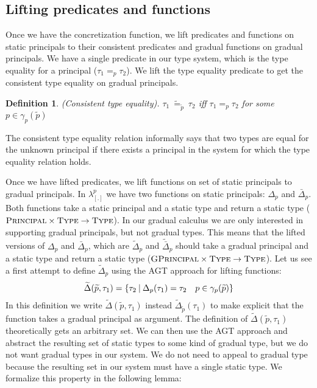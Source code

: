 \documentclass{article}
\newcommand\newcalculus[0]{$\lambda^p_{\left[.\right]}$}
\newcommand\wt[1]{\widetilde{#1}}
\newtheorem{definition}{Definition}[section]
\begin{document}
\subsection{Lifting predicates and functions}
Once we have the concretization function, we lift predicates and functions on static principals to their consistent predicates and gradual functions on gradual principals. We have a single predicate in our type system, which is the type equality for a principal ($\tau_1 =_p \tau_2$). We lift the type equality predicate to get the consistent type equality on gradual principals.
\begin{definition}(Consistent type equality). $\tau_1 \: \widetilde{=}_{\widetilde{p}} \: \tau_2$ iff 
$\tau_1 =_p \tau_2$ for some $p \in \gamma_p(\widetilde{p})$ 
\end{definition}
The consistent type equality relation informally says that two types are equal for the unknown principal if there exists a principal in the system for which the type equality relation holds.

Once we have lifted predicates, we lift functions on set of static principals to gradual principals. In \newcalculus{} we have two functions on static principals: $\Delta_p$ and $\bar{\Delta}_p$. Both functions take a static principal and a static type and return a static type ($\textsc{Principal} \times \textsc{Type} \rightarrow \textsc{Type}$). In our gradual calculus we are only interested in supporting gradual principals, but not gradual types. This means that the lifted versions of $\Delta_p$ and $\bar{\Delta}_p$, which are $\wt{\Delta}_p$ and $\wt{\bar{\Delta}}_p$ should take a gradual principal and a static type and return a static type ($\textsc{GPrincipal} \times \textsc{Type} \rightarrow \textsc{Type}$). Let us see a first attempt to define $\wt{\Delta}_p$ using the AGT approach for lifting functions:
\[
\begin{tabular}{c}
$\wt{\Delta}(\wt{p},\tau_1)= \{\tau_2 \:| \: \Delta_p(\tau_1) = \tau_2 \quad p \in \gamma_p(\wt{p})\}$ \\
\end{tabular}
\]
In this definition we write $\wt{\Delta}(\wt{p},\tau_1)$ instead $\wt{\Delta}_{\wt{p}}(\tau_1)$ to make explicit that the function takes a gradual principal as argument. The definition of $\wt{\Delta}(\wt{p},\tau_1)$ theoretically gets an arbitrary set. We can then use the AGT approach and abstract the resulting set of static types to some kind of gradual type, but we do not want gradual types in our system. We do not need to appeal to gradual type because the resulting set in our system must have a single static type. We formalize this property in the following lemma:
\end{document}
